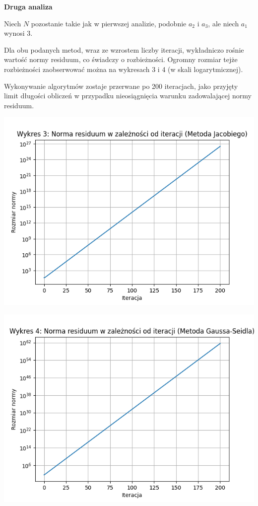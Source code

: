 \documentclass{article}
\begin{document}
\textbf{Druga analiza}

Niech $N$ pozostanie takie jak w pierwszej analizie, podobnie $a_2$ i $a_3$, ale niech $a_1$ wynosi 3.

Dla obu podanych metod, wraz ze wzrostem liczby iteracji, wykładniczo rośnie wartość normy residuum, co świadczy o rozbieżności. Ogromny rozmiar tejże rozbieżności zaobserwować można na wykresach 3 i 4 (w skali logarytmicznej).

Wykonywanie algorytmów zostaje przerwane po 200 iteracjach, jako przyjęty limit długości obliczeń w przypadku nieosiągnięcia warunku zadowalającej normy residuum.

\includegraphics[scale=0.67]{chart3.png}

\includegraphics[scale=0.67]{chart4.png}
\end{document}
